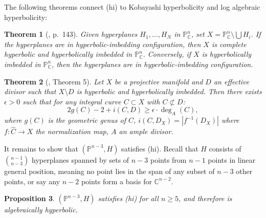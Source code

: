 \documentclass{amsart}
\newtheorem{theorem}{Theorem}[section]
\newtheorem{proposition}[theorem]{Proposition}
\theoremstyle{definition}
\theoremstyle{remark}
\begin{document}
The following theorems connect (hi) to Kobayashi hyperbolicity and log algebraic hyperbolicity:

\begin{theorem}[\cite{Ko98}, p.~143]\label{thm}
Given hyperplanes $H_1,\ldots,H_N$ in $\mathbb{P}^n_{\mathbb{C}}$, set $X = \mathbb{P}^n_{\mathbb{C}} \setminus \bigcup H_i$. If the hyperplanes are in hyperbolic-imbedding configuration, then $X$ is complete hyperbolic and hyperbolically imbedded in $\mathbb{P}^n_{\mathbb{C}}$. Conversely, if $X$ is hyperbolically imbedded in $\mathbb{P}^n_{\mathbb{C}}$, then the hyperplanes are in hyperbolic-imbedding configuration.
\end{theorem}

\begin{theorem}[\cite{pacienza2006logarithmickobayashiconjecture}, Theorem 5]
Let $X$ be a projective manifold and $D$ an effective divisor such that $X \setminus D$ is hyperbolic and hyperbolically imbedded. Then there exists $\epsilon > 0$ such that for any integral curve $C \subset X$ with $C \not\subset D$:
\[ 2g(C) - 2 + i(C,D) \geq \epsilon\cdot \deg_A(C), \]
where $g(C)$ is the geometric genus of $C$, $i(C,D_X) = |f^{-1}(D_X)|$ where $f:\widehat{C}\rightarrow X$ the normalization map, $A$ an ample divisor.
\end{theorem}

It remains to show that $(\mathbb{P}^{n-3}, H)$ satisfies (hi). Recall that $H$ consists of $\binom{n-1}{n-3}$ hyperplanes spanned by sets of $n-3$ points from $n-1$ points in linear general position, meaning no point lies in the span of any subset of $n-3$ other points, or say any $n-2$ points form a basis for $\mathbb C^{n-2}$.

\begin{proposition}\label{prop3}
$(\mathbb{P}^{n-3}, H)$ satisfies (hi) for all $n \geq 5$, and therefore is algebraically hyperbolic.
\end{proposition}
\end{document}
